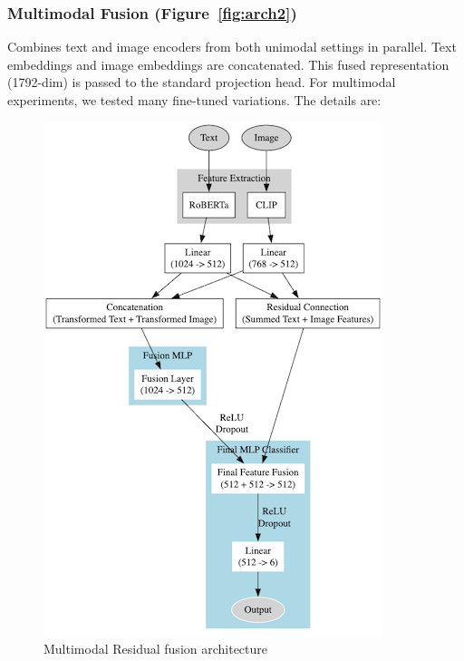\subsubsection*{Multimodal Fusion (Figure~\ref{fig:arch2})}
Combines text and image encoders from both unimodal settings in parallel. Text embeddings and image embeddings are concatenated. This fused representation (1792-dim) is passed to the standard projection head. For multimodal experiments, we tested many fine-tuned variations. The details are:

\begin{figure}[h]
    \centering
    \includegraphics[height=0.6\textheight]{images/residual.png}
    \caption{Multimodal Residual fusion architecture}
    \label{fig:residual}
\end{figure}

